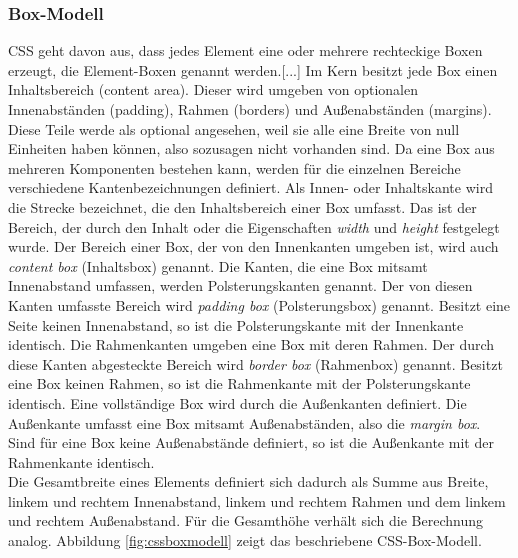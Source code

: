 \subsubsection{Box-Modell} \glqq CSS geht davon aus, dass jedes Element eine oder mehrere rechteckige Boxen erzeugt, die Element-Boxen genannt werden.[...] Im Kern besitzt jede Box einen Inhaltsbereich (content area). Dieser wird umgeben von optionalen Innenabständen (padding), Rahmen (borders) und Außenabständen (margins). Diese Teile werde als optional angesehen, weil sie alle eine Breite von null Einheiten haben können, also sozusagen nicht vorhanden sind.\grqq{}\cite[S.167]{MeyeCasc2005} \glqq Da eine Box aus mehreren Komponenten bestehen kann, werden für die einzelnen Bereiche verschiedene Kantenbezeichnungen definiert. Als Innen- oder Inhaltskante wird die Strecke bezeichnet, die den Inhaltsbereich einer Box umfasst. Das ist der Bereich, der durch den Inhalt oder die Eigenschaften \textit{width} und \textit{height} festgelegt wurde. Der Bereich einer Box, der von den Innenkanten umgeben ist, wird auch \textit{content box} (Inhaltsbox) genannt. Die Kanten, die eine Box mitsamt Innenabstand umfassen, werden Polsterungskanten genannt. Der von diesen Kanten umfasste Bereich wird \textit{padding box} (Polsterungsbox) genannt. Besitzt eine Seite keinen Innenabstand, so ist die Polsterungskante mit der Innenkante identisch. Die Rahmenkanten umgeben eine Box mit deren Rahmen. Der durch diese Kanten abgesteckte Bereich wird \textit{border box} (Rahmenbox) genannt. Besitzt eine Box keinen Rahmen, so ist die Rahmenkante mit der Polsterungskante identisch. Eine vollständige Box wird durch die Außenkanten definiert. Die Außenkante umfasst eine Box mitsamt Außenabständen, also die \textit{margin box}. Sind für eine Box keine Außenabstände definiert, so ist die Außenkante mit der Rahmenkante identisch.\grqq{}\cite{SelfHtml20145}\\Die Gesamtbreite eines Elements definiert sich dadurch als Summe aus Breite, linkem und rechtem Innenabstand, linkem und rechtem Rahmen und dem linkem und rechtem Außenabstand. Für die Gesamthöhe verhält sich die Berechnung analog. Abbildung \ref{fig:cssboxmodell} zeigt das beschriebene CSS-Box-Modell.

